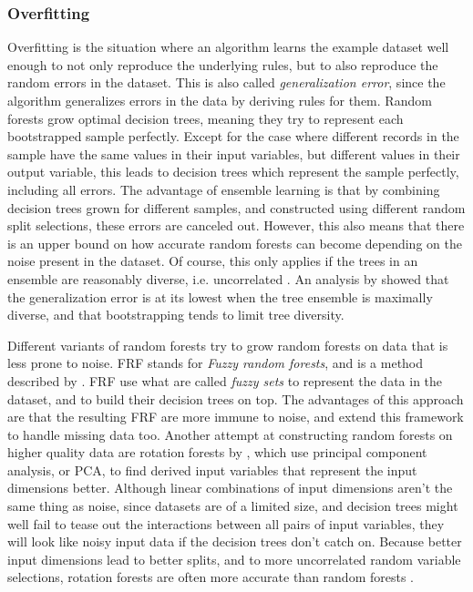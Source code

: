 \documentclass[a4paper,man,12pt,apacite,floatsintext,draftfirst]{apa6} %
\begin{document}
\subsubsection{Overfitting}
Overfitting \cite{wpOF} is the situation where an algorithm learns the
example dataset well enough to not only reproduce the underlying rules,
but to also reproduce the random errors in the dataset.
This is also called \emph{generalization error}, since the algorithm
generalizes errors in the data by deriving rules for them.
Random forests grow optimal decision trees, meaning they try to represent
each bootstrapped sample perfectly.
Except for the case where different records in the sample have the same
values in their input variables, but different values in their output variable,
this leads to decision trees which represent the sample perfectly,
including all errors.
The advantage of ensemble learning is that by combining decision trees grown
for different samples, and constructed using different random split selections,
these errors are canceled out.
However, this also means that there is an upper bound on how accurate
random forests can become depending on the noise present in the dataset.
Of course, this only applies if the trees in an ensemble are reasonably
diverse, i.e. uncorrelated \cite{breiman2001random}.
An analysis by \cite{liu2005maximizing} showed that the generalization error
is at its lowest when the tree ensemble is maximally diverse,
and that bootstrapping tends to limit tree diversity.

Different variants of random forests try to grow random forests on data
that is less prone to noise.
FRF stands for \emph{Fuzzy random forests}, and is a method described by
\cite{bonissone2008fuzzy}.
FRF use what are called \emph{fuzzy sets} to represent the data in the dataset,
and to build their decision trees on top.
The advantages of this approach are that the resulting FRF are more immune
to noise, and \cite{cadenas2012extending} extend this framework to
handle missing data too.
Another attempt at constructing random forests on higher quality data are
rotation forests by \cite{rodriguez2006rotation}, which use
principal component analysis, or PCA, to find derived input variables that
represent the input dimensions better.
Although linear combinations of input dimensions aren't the same thing
as noise, since datasets are of a limited size, and decision trees
might well fail to tease out the interactions between all pairs of input
variables, they will look like noisy input data if the decision trees
don't catch on.
Because better input dimensions lead to better splits, and to more
uncorrelated random variable selections, rotation forests are often more
accurate than random forests \cite{rodriguez2006rotation}.
\end{document}
